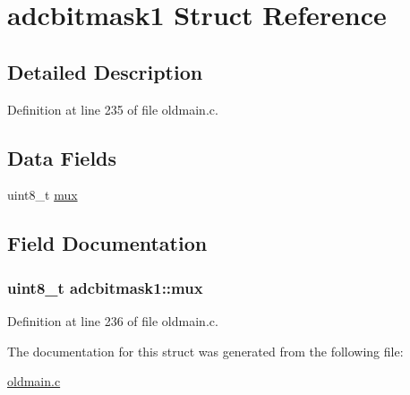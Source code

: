 \hypertarget{structadcbitmask1}{\section{adcbitmask1 Struct Reference}
\label{structadcbitmask1}
}


\subsection{Detailed Description}


Definition at line 235 of file oldmain.\-c.

\subsection*{Data Fields}
\begin{DoxyCompactItemize}
\item 
uint8\-\_\-t \hyperlink{structadcbitmask1_a45a0755a70261a4e12b25f3e947fca8c}{mux}
\end{DoxyCompactItemize}


\subsection{Field Documentation}
\hypertarget{structadcbitmask1_a45a0755a70261a4e12b25f3e947fca8c}{
\subsubsection[{mux}]{\setlength{\rightskip}{0pt plus 5cm}uint8\-\_\-t adcbitmask1\-::mux}}\label{structadcbitmask1_a45a0755a70261a4e12b25f3e947fca8c}


Definition at line 236 of file oldmain.\-c.



The documentation for this struct was generated from the following file\-:\begin{DoxyCompactItemize}
\item 
\hyperlink{oldmain_8c}{oldmain.\-c}\end{DoxyCompactItemize}
